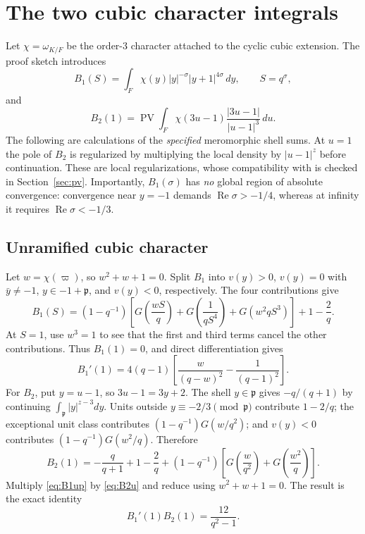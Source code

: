 \documentclass[12pt,letterpaper]{amsart}
\begin{document}
\section{The two cubic character integrals}
Let $\chi=\omega_{K/F}$ be the order-$3$ character attached to the cyclic cubic extension. The proof sketch introduces
\begin{equation}\label{eq:Bdefs}
B_1(S)=\int_F\chi(y)|y|^{-\sigma}|y+1|^{4\sigma}\,dy,
\qquad S=q^\sigma,
\end{equation}
and
\[
B_2(1)=\operatorname{PV}\!\int_F\chi(3u-1)
\frac{|3u-1|}{|u-1|^3}\,du.
\]
The following are calculations of the \emph{specified} meromorphic shell sums. At $u=1$ the pole of $B_2$ is regularized by multiplying the local density by $|u-1|^z$ before continuation. These are local regularizations, whose compatibility with \cite[\S1]{LS83} is checked in Section~\ref{sec:pv}. Importantly, $B_1(\sigma)$ has \emph{no} global region of absolute convergence: convergence near $y=-1$ demands $\operatorname{Re}\sigma>-1/4$, whereas at infinity it requires $\operatorname{Re}\sigma<-1/3$.

\subsection*{Unramified cubic character}
Let $w=\chi(\varpi)$, so $w^2+w+1=0$. Split $B_1$ into $v(y)>0$, $v(y)=0$ with $\bar y\neq-1$, $y\in-1+\mathfrak p$, and $v(y)<0$, respectively. The four contributions give
\begin{equation}\label{eq:B1u}
B_1(S)=(1-q^{-1})\left[G\!\left(\frac{wS}{q}\right)
+G\!\left(\frac1{qS^4}\right)
+G(w^2qS^3)\right]+1-\frac2q.
\end{equation}
At $S=1$, use $w^3=1$ to see that the first and third terms cancel the other contributions. Thus $B_1(1)=0$, and direct differentiation gives
\begin{equation}\label{eq:B1up}
B_1'(1)=4(q-1)\left[\frac{w}{(q-w)^2}-\frac1{(q-1)^2}\right].
\end{equation}
For $B_2$, put $y=u-1$, so $3u-1=3y+2$. The shell $y\in\mathfrak p$ gives $-q/(q+1)$ by continuing $\int_{\mathfrak p}|y|^{z-3}dy$. Units outside $y\equiv-2/3\pmod{\mathfrak p}$ contribute $1-2/q$; the exceptional unit class contributes $(1-q^{-1})G(w/q^2)$; and $v(y)<0$ contributes $(1-q^{-1})G(w^2/q)$. Therefore
\begin{equation}\label{eq:B2u}
B_2(1)=-\frac q{q+1}+1-\frac2q
+(1-q^{-1})\left[G\!\left(\frac w{q^2}\right)+G\!\left(\frac{w^2}{q}\right)\right].
\end{equation}
Multiply \eqref{eq:B1up} by \eqref{eq:B2u} and reduce using $w^2+w+1=0$. The result is the exact identity
\begin{equation}\label{eq:unramproduct}
B_1'(1)B_2(1)=\frac{12}{q^2-1}.
\end{equation}
\end{document}
